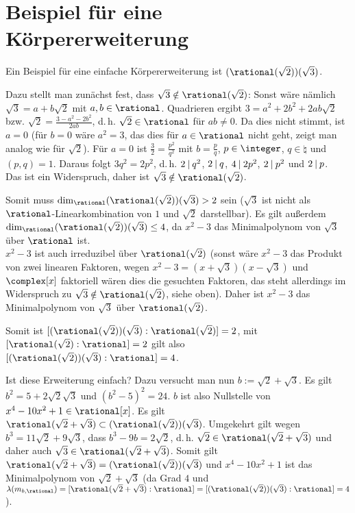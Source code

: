 \section{%
    Beispiel für eine Körpererweiterung%
}

\begin{Bsp}
    Ein Beispiel für eine einfache Körpererweiterung ist
    $(\rational(\sqrt{2}))(\sqrt{3})$.

    Dazu stellt man zunächst fest, dass $\sqrt{3} \notin \rational(\sqrt{2})$:
    Sonst wäre nämlich $\sqrt{3} = a + b\sqrt{2}$ mit $a, b \in \rational$.
    Quadrieren ergibt $3 = a^2 + 2b^2 + 2ab\sqrt{2}$ bzw.
    $\sqrt{2} = \frac{3 - a^2 - 2b^2}{2ab}$, d.\,h. $\sqrt{2} \in \rational$
    für $ab \not= 0$.
    Da dies nicht stimmt, ist $a = 0$
    (für $b = 0$ wäre $a^2 = 3$, das dies für $a \in \rational$ nicht geht,
    zeigt man analog wie für $\sqrt{2}$).
    Für $a = 0$ ist $\frac{3}{2} = \frac{p^2}{q^2}$ mit $b = \frac{p}{q}$,
    $p \in \integer$, $q \in \natural$ und $(p, q) = 1$.
    Daraus folgt $3q^2 = 2p^2$, d.\,h. $2 \mathbin{|} q^2$,
    $2 \mathbin{|} q$, $4 \mathbin{|} 2p^2$, $2 \mathbin{|} p^2$ und $2 \mathbin{|} p$.\\
    Das ist ein Widerspruch, daher ist $\sqrt{3} \notin \rational(\sqrt{2})$.

    Somit muss $\dim_\rational (\rational(\sqrt{2}))(\sqrt{3}) > 2$ sein
    ($\sqrt{3}$ ist nicht als $\rational$-Linearkombination von
    $1$ und $\sqrt{2}$ darstellbar).
    Es gilt außerdem $\dim_\rational (\rational(\sqrt{2}))(\sqrt{3}) \le 4$,
    da $x^2 - 3$ das Minimalpolynom von $\sqrt{3}$ über $\rational$ ist.\\
    $x^2 - 3$ ist auch irreduzibel über $\rational(\sqrt{2})$
    (sonst wäre $x^2 - 3$ das Produkt von zwei linearen Faktoren,
    wegen $x^2 - 3 = (x + \sqrt{3})(x - \sqrt{3})$ und $\complex[x]$
    faktoriell wären dies die gesuchten Faktoren, das steht allerdings im
    Widerspruch zu $\sqrt{3} \notin \rational(\sqrt{2})$, siehe oben).
    Daher ist $x^2 - 3$ das Minimalpolynom von
    $\sqrt{3}$ über $\rational(\sqrt{2})$.

    Somit ist $[(\rational(\sqrt{2}))(\sqrt{3}) : \rational(\sqrt{2})] = 2$,
    mit $[\rational(\sqrt{2}) : \rational] = 2$ gilt also
    $[(\rational(\sqrt{2}))(\sqrt{3}) : \rational] = 4$.

    Ist diese Erweiterung einfach?
    Dazu versucht man nun $b := \sqrt{2} + \sqrt{3}$.
    Es gilt $b^2 = 5 + 2\sqrt{2}\sqrt{3}$ und $(b^2 - 5)^2 = 24$.
    $b$ ist also Nullstelle von $x^4 - 10x^2 + 1 \in \rational[x]$.
    Es gilt $\rational(\sqrt{2} + \sqrt{3}) \subset
    (\rational(\sqrt{2}))(\sqrt{3})$.
    Umgekehrt gilt wegen $b^3 = 11\sqrt{2} + 9\sqrt{3}$, dass
    $b^3 - 9b = 2\sqrt{2}$, d.\,h.
    $\sqrt{2} \in \rational(\sqrt{2} + \sqrt{3})$ und daher auch
    $\sqrt{3} \in \rational(\sqrt{2} + \sqrt{3})$.
    Somit gilt $\rational(\sqrt{2} + \sqrt{3}) =
    (\rational(\sqrt{2}))(\sqrt{3})$ und
    $x^4 - 10x^2 + 1$ ist das Minimalpolynom von $\sqrt{2} + \sqrt{3}$
    (da Grad $4$ und\\
    $\lambda(m_{b,\rational}) =
    [\rational(\sqrt{2} + \sqrt{3}) : \rational] =
    [(\rational(\sqrt{2}))(\sqrt{3}) : \rational] = 4$).
\end{Bsp}

